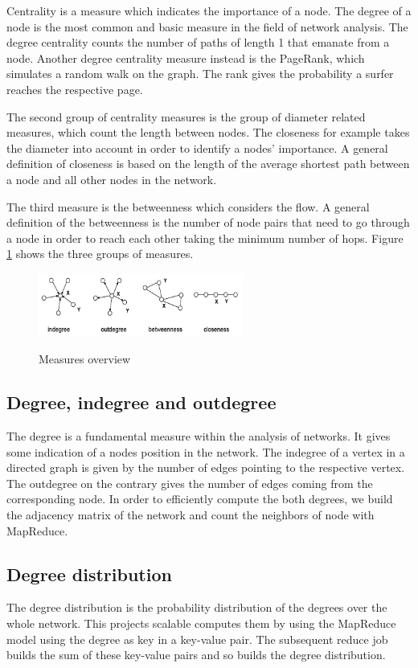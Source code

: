 Centrality is a measure which indicates the importance of a node. The degree of a node is the most common and basic measure in the field of network analysis. The degree centrality counts the number of paths of length 1 that emanate from a node. Another degree centrality measure instead is the PageRank, which simulates a random walk on the graph. The rank gives the probability a surfer reaches the respective page. 

The second group of centrality measures is the group of diameter related measures, which count the length between nodes. The closeness for example takes the diameter into account in order to identify a nodes’ importance. A general definition of closeness is based on the length of the average shortest path between a node and all other nodes in the network. 

The third measure is the betweenness which considers the flow. A general definition of the betweenness is the number of node pairs that need to go through a node in order to reach each other taking the minimum number of hops. Figure \ref{fig1} shows the three groups of measures.

\begin{figure}[H]
	\begin{center}
		\label{fig1}		
		\includegraphics[width=0.6\textwidth]{fig1}	
		\caption{Measures overview}	
	\end{center}
\end{figure}

\subsection{Degree, indegree and outdegree}
The degree is a fundamental measure within the analysis of networks. It gives some indication of a nodes position in the network. The indegree of a vertex in a directed graph is given by the number of edges pointing to the respective vertex. The outdegree on the contrary gives the number of edges coming from the corresponding node. In order to efficiently compute the both degrees, we build the adjacency matrix of the network and count the neighbors of node with MapReduce.

\subsection{Degree distribution}
The degree distribution is the probability distribution of the degrees over the whole network. This projects scalable computes them by using the MapReduce model using the degree as key in a key-value pair. The subsequent reduce job builds the sum of these key-value pairs and so builds the degree distribution.

